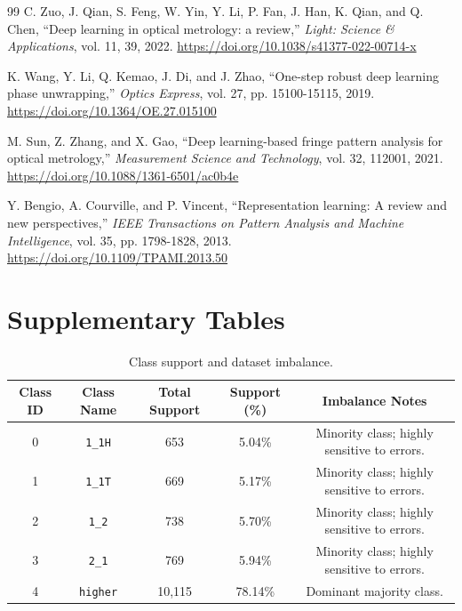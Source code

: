 \documentclass[review,3p,times]{elsarticle}
\begin{document}
\begin{thebibliography}{99}
 C. Zuo, J. Qian, S. Feng, W. Yin, Y. Li, P. Fan, J. Han, K. Qian, and Q. Chen, ``Deep learning in optical metrology: a review,'' \emph{Light: Science \& Applications}, vol. 11, 39, 2022. \url{https://doi.org/10.1038/s41377-022-00714-x}

 K. Wang, Y. Li, Q. Kemao, J. Di, and J. Zhao, ``One-step robust deep learning phase unwrapping,'' \emph{Optics Express}, vol. 27, pp. 15100-15115, 2019. \url{https://doi.org/10.1364/OE.27.015100}

 M. Sun, Z. Zhang, and X. Gao, ``Deep learning-based fringe pattern analysis for optical metrology,'' \emph{Measurement Science and Technology}, vol. 32, 112001, 2021. \url{https://doi.org/10.1088/1361-6501/ac0b4e}

 Y. Bengio, A. Courville, and P. Vincent, ``Representation learning: A review and new perspectives,'' \emph{IEEE Transactions on Pattern Analysis and Machine Intelligence}, vol. 35, pp. 1798-1828, 2013. \url{https://doi.org/10.1109/TPAMI.2013.50}

\end{thebibliography}

\appendix
\section{Supplementary Tables}
\label{sec:appendix}

\renewcommand{\thetable}{S\arabic{table}}
\setcounter{table}{0}

\begin{table}[htbp]
\centering
\caption{Class support and dataset imbalance.}
\label{tab:table4}
\begin{tabular}{ccccc}
\toprule
\textbf{Class ID} & \textbf{Class Name} & \textbf{Total Support} & \textbf{Support (\%)} & \textbf{Imbalance Notes} \\
\midrule
0 & \texttt{1\_1H} & 653 & 5.04\% & Minority class; highly sensitive to errors. \\
1 & \texttt{1\_1T} & 669 & 5.17\% & Minority class; highly sensitive to errors. \\
2 & \texttt{1\_2} & 738 & 5.70\% & Minority class; highly sensitive to errors. \\
3 & \texttt{2\_1} & 769 & 5.94\% & Minority class; highly sensitive to errors. \\
4 & \texttt{higher} & 10,115 & 78.14\% & Dominant majority class. \\
\bottomrule
\end{tabular}
\end{table}
\end{document}
